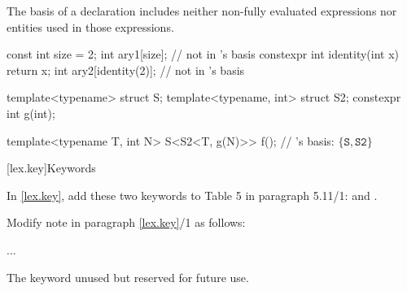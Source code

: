 \begin{undecided}
\begin{std.txt}

\alinea
\enternote
The basis of a declaration includes neither non-fully evaluated expressions nor
entities used in those expressions.
\begin{example}
   \begin{codeblock}
    const int size = 2;
    int ary1[size];                         //  not in 's basis
    constexpr int identity(int x) { return x; }
    int ary2[identity(2)];                  //  not in 's basis

    template<typename> struct S;
    template<typename, int> struct S2;
    constexpr int g(int);

    template<typename T, int N>
    S<S2<T, g(N)>> f();                     // 's basis: $\{ \mathtt{S}, \mathtt{S2} \}$ 
   \end{codeblock}
\end{example}
\exitnote

\end{std.txt}
\end{undecided}

\setcounter{section}{10}
[lex.key]{Keywords}

In \ref{lex.key}, add these two keywords to Table 5 in paragraph
5.11/1:  and .

\noindent
Modify note in paragraph \ref{lex.key}/1 as follows:
\begin{std.txt}
    \resetalinea[0]
    \alinea
    ...


    \enternote
    The   keyword 
    unused but   
    reserved for future use.
    \exitnote
\end{std.txt}
